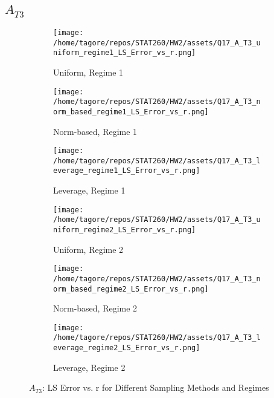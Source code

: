 \documentclass{article}
\begin{document}
\newpage

\subsection*{\(A_{T3}\)}

\begin{figure}[H]
    \centering
    \begin{subfigure}[b]{0.32\textwidth}
        \centering
        \texttt{[image: /home/tagore/repos/STAT260/HW2/assets/Q17\_A\_T3\_uniform\_regime1\_LS\_Error\_vs\_r.png]}
        \caption{Uniform, Regime 1}
        \label{fig:T3_uniform_regime1}
    \end{subfigure}
    \begin{subfigure}[b]{0.32\textwidth}
        \centering
        \texttt{[image: /home/tagore/repos/STAT260/HW2/assets/Q17\_A\_T3\_norm\_based\_regime1\_LS\_Error\_vs\_r.png]}
        \caption{Norm-based, Regime 1}
        \label{fig:T3_norm_based_regime1}
    \end{subfigure}
    \begin{subfigure}[b]{0.32\textwidth}
        \centering
        \texttt{[image: /home/tagore/repos/STAT260/HW2/assets/Q17\_A\_T3\_leverage\_regime1\_LS\_Error\_vs\_r.png]}
        \caption{Leverage, Regime 1}
        \label{fig:T3_leverage_regime1}
    \end{subfigure}
    
    \vspace{0.5cm}
    
    \begin{subfigure}[b]{0.32\textwidth}
        \centering
        \texttt{[image: /home/tagore/repos/STAT260/HW2/assets/Q17\_A\_T3\_uniform\_regime2\_LS\_Error\_vs\_r.png]}
        \caption{Uniform, Regime 2}
        \label{fig:T3_uniform_regime2}
    \end{subfigure}
    \begin{subfigure}[b]{0.32\textwidth}
        \centering
        \texttt{[image: /home/tagore/repos/STAT260/HW2/assets/Q17\_A\_T3\_norm\_based\_regime2\_LS\_Error\_vs\_r.png]}
        \caption{Norm-based, Regime 2}
        \label{fig:T3_norm_based_regime2}
    \end{subfigure}
    \begin{subfigure}[b]{0.32\textwidth}
        \centering
        \texttt{[image: /home/tagore/repos/STAT260/HW2/assets/Q17\_A\_T3\_leverage\_regime2\_LS\_Error\_vs\_r.png]}
        \caption{Leverage, Regime 2}
        \label{fig:T3_leverage_regime2}
    \end{subfigure}
    
    \caption{\(A_{T3}\): LS Error vs. r for Different Sampling Methods and Regimes}
    \label{fig:T3_comparison}
\end{figure}

\end{document}
